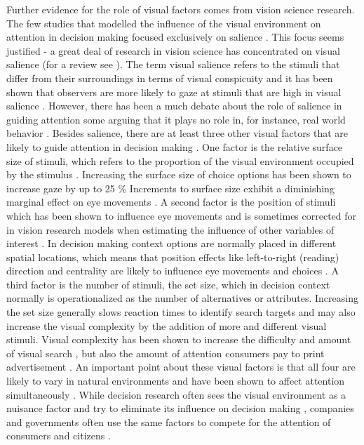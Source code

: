 \documentclass[english,natbib,man,floatsintext]{apa6}
\begin{document}
Further evidence for the role of visual factors comes from vision science research. The few studies that modelled the influence of the visual environment on attention in decision making focused exclusively on salience \citep{chen2013,navalpakkam2010, towal2013a}. This focus seems justified - a great deal of research in vision science has concentrated on visual salience (for a review see \cite{borji2012a}). The term visual salience refers to the stimuli that differ from their surroundings in terms of visual conspicuity and it has been shown that observers are more likely to gaze at stimuli that are high in visual salience \cite{itti2000}. However, there has been a much debate about the role of salience in guiding attention some arguing that it plays no role in, for instance, real world behavior \citep{tatler2011a}. Besides salience, there are at least three other visual factors that are likely to guide attention in decision making \citep{orquin2013a, wedel2008}. 
One factor is the relative surface size of stimuli, which refers to the proportion of the visual environment occupied by the stimulus \citep[for a review see][]{peschel2013a}. Increasing the surface size of choice options has been shown to increase gaze by up to 25 \% \citep{chandon2009a} Increments to surface size exhibit a diminishing marginal effect on eye movements \citep{lohse1997a}. A second factor is the position of stimuli which has been shown to influence eye movements and is sometimes corrected for in vision research models when estimating the influence of other variables of interest \citep{clarke2014a}. In decision making context options are normally placed in different spatial locations, which means that position effects like left-to-right (reading) direction and centrality are likely to influence eye movements and choices \citep{atalay2012a, meissner2016a}. A third factor is the number of stimuli, the set size, which in decision context normally is operationalized as the number of alternatives or attributes. Increasing the set size generally slows reaction times to identify search targets \citep{wolfe2010} and may also increase the visual complexity by the addition of more and different visual stimuli. Visual complexity has been shown to increase the difficulty and amount of visual search \citep{rosenholtz2007a}, but also the amount of attention consumers pay to print advertisement \citep{pieters2010a}. 
An important point about these visual factors is that all four are likely to vary in natural environments and have been shown to affect attention simultaneously \citep{orquin2019a}. While decision research often sees the visual environment as a nuisance factor and try to eliminate its influence on decision making \citep{brandstatter2014, gloeckner2011a, perkovic2018}, companies and governments often use the same factors to compete for the attention of consumers and citizens \citep{pieters2017, orquinwedel2020}.   
\end{document}
